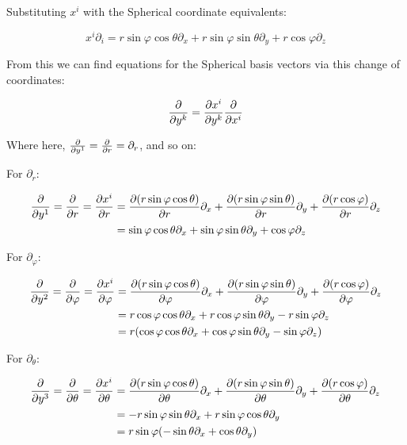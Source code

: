 \documentclass[10pt]{article}
\begin{document}
\begin{enumerate}[start=1,label={\bfseries Exercise \arabic*:},leftmargin=1in]
        Substituting \(x^i\) with the Spherical coordinate equivalents:

        \begin{equation*}
            x^i \partial_i = r \sin{\varphi} \cos{\theta} \partial_x + r \sin{\varphi} \sin{\theta} \partial_y + r \cos{\varphi} \partial_z  
        \end{equation*}

        From this we can find equations for the Spherical basis vectors via this change of coordinates:

        \begin{equation*}
            \pdv{y^k} = \pdv{x^i}{y^k} \pdv{x^i} 
        \end{equation*}

        Where here, \( \pdv{y^1} = \pdv{r} = \partial_r\), and so on:

        For \(\partial_r\):

        \begin{align*}
            \pdv{y^1} = \pdv{r} = \pdv{x^i}{r} &= \pdv{(r \sin{\varphi} \cos{\theta})}{r} \partial_x + \pdv{(r \sin{\varphi} \sin{\theta})}{r} \partial_y + \pdv{(r \cos{\varphi})}{r} \partial_z \\
                                               &= \sin{\varphi} \cos{\theta} \partial_x + \sin{\varphi} \sin{\theta} \partial_y + \cos{\varphi} \partial_z
        \end{align*}
        
        For \(\partial_{\varphi}\):

        \begin{align*}
            \pdv{y^2} = \pdv{\varphi} = \pdv{x^i}{\varphi} &= \pdv{(r \sin{\varphi} \cos{\theta})}{\varphi} \partial_x + \pdv{(r \sin{\varphi} \sin{\theta})}{\varphi} \partial_y + \pdv{(r \cos{\varphi})}{\varphi} \partial_z \\
                                               &= r \cos{\varphi} \cos{\theta} \partial_x + r \cos{\varphi} \sin{\theta} \partial_y - r \sin{\varphi} \partial_z \\
                                               &= r ( \cos{\varphi} \cos{\theta} \partial_x + \cos{\varphi} \sin{\theta} \partial_y - \sin{\varphi} \partial_z )
        \end{align*}
 
 
        For \(\partial_{\theta}\):

        \begin{align*}
            \pdv{y^3} = \pdv{\theta} = \pdv{x^i}{\theta} &= \pdv{(r \sin{\varphi} \cos{\theta})}{\theta} \partial_x + \pdv{(r \sin{\varphi} \sin{\theta})}{\theta} \partial_y + \pdv{(r \cos{\varphi})}{\theta} \partial_z \\
                                               &= - r \sin{\varphi} \sin{\theta} \partial_x + r \sin{\varphi} \cos{\theta} \partial_y \\
                                               &= r \sin{\varphi} ( - \sin{\theta} \partial_x + \cos{\theta} \partial_y )
        \end{align*}


\end{enumerate}
\end{document}
